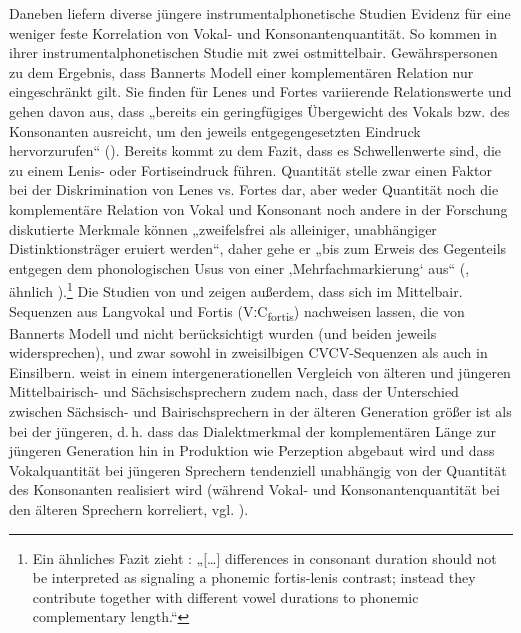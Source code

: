 Daneben liefern diverse jüngere instrumentalphonetische Studien Evidenz für eine weniger feste Korrelation von Vokal- und Konsonantenquantität. So kommen \citet{MoosmüllerScheutz2018} in ihrer instrumentalphonetischen Studie mit zwei ostmittelbair. Gewährspersonen zu dem Ergebnis, dass Bannerts Modell einer komplementären Relation nur eingeschränkt gilt. Sie finden für Lenes und Fortes variierende Relationswerte und gehen davon aus, dass „bereits ein geringfügiges Übergewicht des Vokals bzw. des Konsonanten ausreicht, um den jeweils entgegengesetzten Eindruck hervorzurufen“ (\citealt[357]{MoosmüllerScheutz2018}). Bereits \citet{Scheutz1984, Scheutz1985} kommt zu dem Fazit, dass es Schwellenwerte sind, die zu einem Lenis- oder Fortiseindruck führen. Quantität stelle zwar einen Faktor bei der Diskrimination von Lenes vs. Fortes dar, aber weder Quantität noch die komplementäre Relation von Vokal und Konsonant noch andere in der Forschung diskutierte Merkmale können „zweifelsfrei als alleiniger, unabhängiger Distinktionsträger eruiert werden“, daher gehe er „bis zum Erweis des Gegenteils entgegen dem phonologischen Usus von einer ‚Mehrfachmarkierung‘ aus“ (\citealt[160]{Scheutz1985}, ähnlich \citealt[27]{Scheutz1984}).\footnote{Ein ähnliches Fazit zieht \citet[17]{Kleber2017}: „[\ldots] differences in consonant duration should not be interpreted as signaling a phonemic fortis-lenis contrast; instead they contribute together with different vowel durations to phonemic complementary length.“}  Die Studien von \citet{KlinglerEtAl2017} und \citet{MoosmüllerBrandstätter2014} zeigen außerdem, dass sich im Mittelbair. Sequenzen aus Langvokal und Fortis (VːC\textsubscript{fortis}) nachweisen lassen, die von Bannerts Modell und \citet{Pfalz1913} nicht berücksichtigt wurden (und beiden jeweils widersprechen), und zwar sowohl in zweisilbigen CVCV-Sequenzen als auch in Einsilbern. \citet{Kleber2017} weist in einem intergenerationellen Vergleich von älteren und jüngeren Mittelbairisch- und Sächsischsprechern zudem nach, dass der Unterschied zwischen Sächsisch- und Bairischsprechern in der älteren Generation größer ist als bei der jüngeren, d.\,h. dass das Dialektmerkmal der komplementären Länge zur jüngeren Generation hin in Produktion wie Perzeption abgebaut wird und dass Vokalquantität bei jüngeren Sprechern tendenziell unabhängig von der Quantität des Konsonanten realisiert wird (während Vokal- und Konsonantenquantität bei den älteren Sprechern korreliert, vgl. \citealt[12 und 18]{Kleber2017}).


